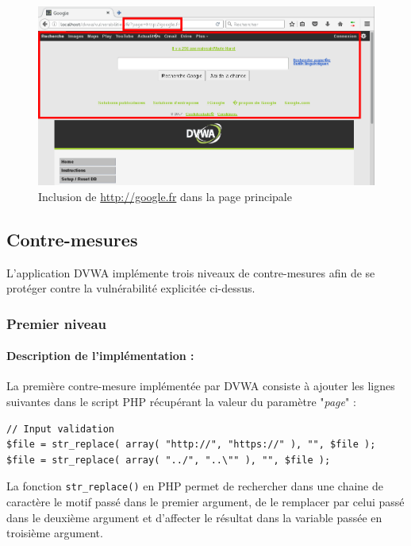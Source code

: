 \begin{figure}[!h]
\begin{center}
\includegraphics[scale=.45]{images/fi5.png}

\caption{Inclusion de \url{http://google.fr} dans la page principale}
\label{fi_dvwa5}
\end{center}
\end{figure}

\subsection{Contre-mesures}

L'application DVWA implémente trois niveaux de contre-mesures afin de se protéger contre la vulnérabilité explicitée ci-dessus.

\subsubsection{Premier niveau}

\paragraph{Description de l'implémentation :}

La première contre-mesure implémentée par DVWA consiste à ajouter les lignes suivantes dans le script PHP récupérant la valeur du paramètre "\textit{page}" :

\begin{lstlisting}
// Input validation
$file = str_replace( array( "http://", "https://" ), "", $file );
$file = str_replace( array( "../", "..\"" ), "", $file ); 
\end{lstlisting}

La fonction \texttt{str\_replace()} en PHP permet de rechercher dans une chaine de caractère le motif passé dans le premier argument, de le remplacer par celui passé dans le deuxième argument et d'affecter le résultat dans la variable passée en troisième argument.


